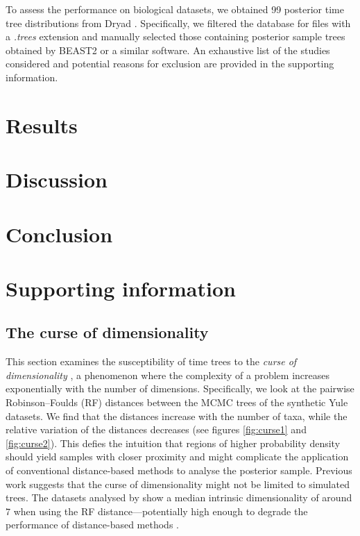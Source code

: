 \documentclass[10pt,letterpaper]{article}
\begin{document}
To assess the performance on biological datasets, we obtained 99 posterior time tree distributions from Dryad \cite{dryad}. Specifically, we filtered the database for files with a \emph{.trees} extension and manually selected those containing posterior sample trees obtained by BEAST2 or a similar software. An exhaustive list of the studies considered and potential reasons for exclusion are provided in the supporting information.

\section*{Results}

\section*{Discussion}

\section*{Conclusion}

\section*{Supporting information}

\subsection*{The curse of dimensionality}

This section examines the susceptibility of time trees to the \emph{curse of dimensionality} \cite{curse,curse2}, a phenomenon where the complexity of a problem increases exponentially with the number of dimensions. Specifically, we look at the pairwise Robinson–Foulds (RF) distances between the MCMC trees of the synthetic Yule datasets. We find that the distances increase with the number of taxa, while the relative variation of the distances decreases (see figures \ref{fig:curse1} and \ref{fig:curse2}). This defies the intuition that regions of higher probability density should yield samples with closer proximity and might complicate the application of conventional distance-based methods to analyse the posterior sample. Previous work suggests that the curse of dimensionality might not be limited to simulated trees. The datasets analysed by \cite{dimensionality} show a median intrinsic dimensionality of around $7$ when using the RF distance---potentially high enough to degrade the performance of distance-based methods \cite{curseimplications}.
\end{document}
